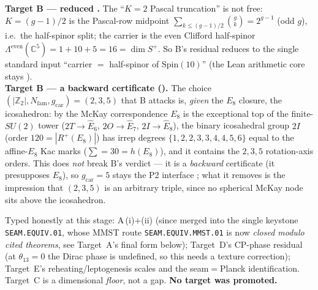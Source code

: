 \documentclass[11pt,a4paper]{article}
\newcommand{\Nfam}{N_{\mathrm{fam}}}
\newcommand{\gcar}{g_{\mathrm{car}}}
\providecommand{\Z}{\mathbb{Z}}
\begin{document}
\begin{winbox}
\smallskip\noindent\textbf{Target B --- reduced \mE.} The ``$K=2$ Pascal truncation'' is not free:
$K=(g-1)/2$ is the Pascal-row midpoint $\sum_{k\le(g-1)/2}\binom{g}{k}=2^{g-1}$ (odd $g$), i.e.\ the half-spinor
split; the carrier is the even Clifford half-spinor $\Lambda^{\mathrm{even}}(\mathbb C^{5})=1+10+5=16=\dim S^+$. So
B's residual reduces to the single standard input ``carrier $=$ half-spinor of $\mathrm{Spin}(10)$'' (the Lean
arithmetic core stays \mE).
\smallskip\\
\noindent\textbf{Target B --- a backward certificate ().} The choice
$(|\Z_2|,\Nfam,\gcar)=(2,3,5)$ that B attacks is, \emph{given} the $E_8$ closure, the icosahedron: by the
McKay correspondence $E_8$ is the exceptional top of the finite-$SU(2)$ tower ($2T{\to}\hat E_6$,
$2O{\to}\hat E_7$, $2I{\to}\hat E_8$), the binary icosahedral group $2I$ (order $120=|R^+(E_8)|$) has irrep
degrees $\{1,2,2,3,3,4,4,5,6\}$ equal to the affine-$E_8$ Kac marks ($\sum=30=h(E_8)$), and it contains the
$2,3,5$ rotation-axis orders. This does \emph{not} break B's verdict --- it is a \emph{backward} certificate
(it presupposes $E_8$), so $\gcar=5$ stays the P2 interface \mO; what it removes is the impression that
$(2,3,5)$ is an arbitrary triple, since no spherical McKay node sits above the icosahedron.

\smallskip\noindent Typed honestly at this stage: A\,(i)$+$(ii) (since merged into the single keystone
\texttt{SEAM.EQUIV.01}, whose MMST route \texttt{SEAM.EQUIV.MMST.01} is now \emph{closed modulo cited theorems}, see Target~A's final form below);
Target~D's CP-phase residual (at $\theta_{13}=0$ the
Dirac phase is undefined, so this needs a texture correction); Target~E's reheating/leptogenesis scales and the
seam$=$Planck identification. Target~C is a dimensional \emph{floor}, not a gap. \textbf{No target was promoted.}
\end{winbox}
\end{document}
